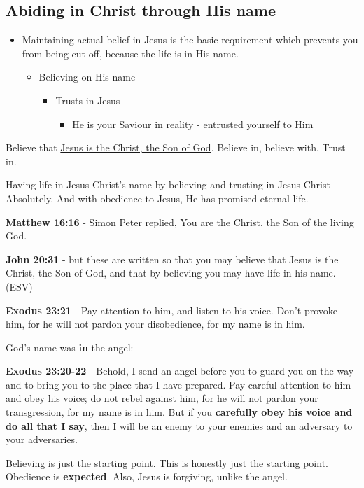 \documentclass[11pt]{article}
\begin{document}
\subsection{Abiding in Christ through His name}
\label{sec:org565c408}
\begin{itemize}
\item Maintaining actual belief in Jesus is the basic requirement which prevents you from being cut off, because the life is in His name.
\begin{itemize}
\item Believing on His name
\begin{itemize}
\item Trusts in Jesus
\begin{itemize}
\item He is your Saviour in reality - entrusted yourself to Him
\end{itemize}
\end{itemize}
\end{itemize}
\end{itemize}

Believe that \uline{Jesus is the Christ, the Son of God}. Believe in, believe with. Trust in.

Having life in Jesus Christ's name by believing and trusting in Jesus Christ - Absolutely.
And with obedience to Jesus, He has promised eternal life.

\textbf{Matthew 16:16} - Simon Peter replied, You are the Christ, the Son of the living God.

\textbf{John 20:31} - but these are written so that you may believe that Jesus is the Christ, the Son of God, and that by believing you may have life in his name. (ESV)

\textbf{Exodus 23:21} - Pay attention to him, and listen to his voice. Don't provoke him, for he will not pardon your disobedience, for my name is in him.

God's name was \textbf{in} the angel:

\textbf{Exodus 23:20-22} - Behold, I send an angel before you to guard you on the way and to bring you to the place that I have prepared. Pay careful attention to him and obey his voice; do not rebel against him, for he will not pardon your transgression, for my name is in him. But if you \textbf{carefully obey his voice and do all that I say}, then I will be an enemy to your enemies and an adversary to your adversaries.

Believing is just the starting point. This is honestly just the starting point. Obedience is \textbf{expected}. Also, Jesus is forgiving, unlike the angel.
\end{document}
